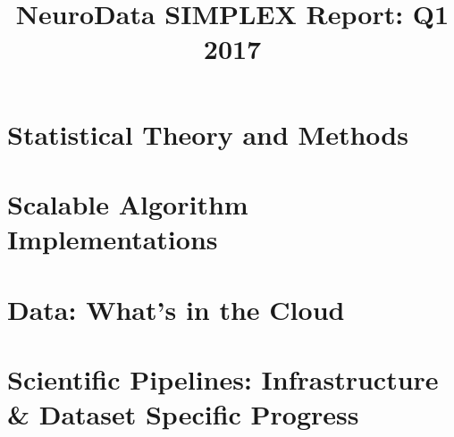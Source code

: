 \documentclass[12pt]{article}
\title{NeuroData SIMPLEX Report: Q1 2017}
\begin{document}

\newpage



\section{Statistical Theory and Methods}







%

%
%
%

\section{Scalable Algorithm Implementations}







\section{Data: What's in the Cloud}

\clearpage


\section{Scientific Pipelines: Infrastructure \& Dataset Specific
  Progress}



%







\end{document}
